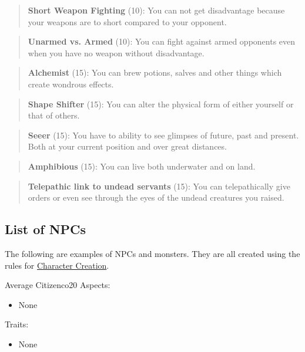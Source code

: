 \documentclass[11pt]{article}
\begin{document}
{\begin{quote}
\textbf{Short Weapon Fighting} (10): You can not get disadvantage because your weapons are to short compared to your opponent.
\end{quote}

\begin{quote}
\textbf{Unarmed vs. Armed} (10): You can fight against armed opponents even when you have no weapon without disadvantage.
\end{quote}

\begin{quote}
\textbf{Alchemist} (15): You can brew potions, salves and other things which create wondrous effects.
\end{quote}

\begin{quote}
\textbf{Shape Shifter} (15): You can alter the physical form of either yourself or that of others.
\end{quote}

\begin{quote}
\textbf{Seeer} (15): You have to ability to see glimpses of future, past and present. Both at your current position and over great distances. 
\end{quote}

\begin{quote}
\textbf{Amphibious} (15): You can live both underwater and on land.
\end{quote}

\begin{quote}
\textbf{Telepathic link to undead servants} (15): You can telepathically give orders or even see through the eyes of the undead creatures you raised. 
\end{quote}
\subsection{List of NPCs}
\label{sec:orga6c84e8}
The following are examples of NPCs and monsters. They are all created using the rules for \hyperref[sec:orgd2f48eb]{Character Creation}. 

\begin{npc}{Average Citizen}{co}{2}{0}
Aspects:
\begin{itemize}
\item None
\end{itemize}
Traits:
\begin{itemize}
\item None
\end{itemize}
\end{npc}

}
\end{document}
